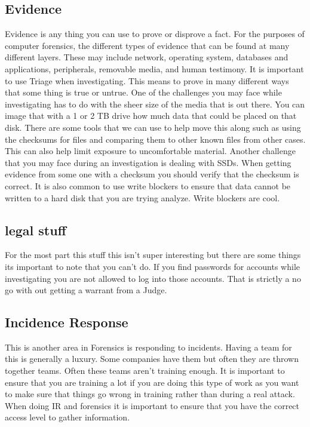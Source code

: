 \documentclass[letterpaper, onecolumn,10pt]{IEEEtran}
\begin{document}
            \subsection{Evidence}
            Evidence is any thing you can use to prove or disprove a fact. For the purposes of computer forensics, the different types of evidence that can be found at many different layers. These may include network, operating system, databases and applications, peripherals, removable media, and human testimony. It is important to use Triage when investigating. This means to prove in many different ways that some thing is true or untrue. One of the challenges you may face while investigating has to do with the sheer size of the media that is out there. You can image that with a 1 or 2 TB drive how much data that could be placed on that disk. There are some tools that we can use to help move this along such as using the checksums for files and comparing them to other known files from other cases. This can also help limit exposure to uncomfortable material. Another challenge that you may face during an investigation is dealing with SSDs. When getting evidence from some one with a checksum you should verify that the checksum is correct. It is also common to use write blockers to ensure that data cannot be written to a hard disk that you are trying analyze. Write blockers are cool.\\
            
            \subsection{legal stuff} For the most part this stuff this isn't super interesting but there are some things its important to note that you can't do. If you find passwords for accounts while investigating you are not allowed to log into those accounts. That is strictly a no go with out getting a warrant from a Judge.\\
            
            \subsection{Incidence Response} This is another area in Forensics is responding to incidents. Having a team for this is generally a luxury. Some companies have them but often they are thrown together teams. Often these teams aren't training enough. It is important to ensure that you are training a lot if you are doing this type of work as you want to make sure that things go wrong in training rather than during a real attack. When doing IR and forensics it is important to ensure that you have the correct access level to gather information.\\ 
            
\end{document}
